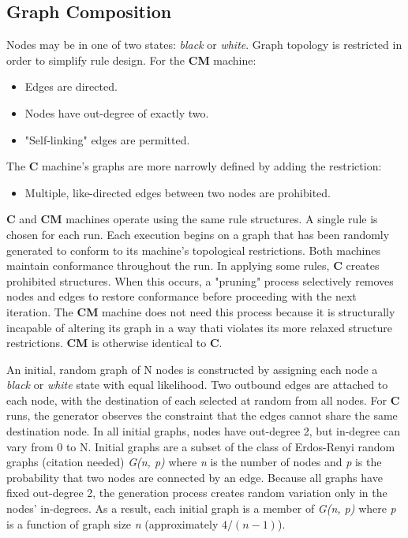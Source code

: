 \documentclass{tufte-handout}
\begin{document}
\subsection{Graph Composition}

Nodes may be in one of two states: \textit{black} or \textit{white}.
Graph topology is restricted in order to simplify rule design. For the
\textbf{CM} machine:

\vspace{1mm}
\begin{itemize}
\setlength{\itemindent}{2em}
    \item Edges are directed.
    \item Nodes have out-degree of exactly two.
    \item "Self-linking" edges are permitted.
\end{itemize}
\vspace{2mm}
The \textbf{C}  machine's graphs are more narrowly defined by adding the
restriction:
\begin{itemize} 
\setlength{\itemindent}{2em}
    \item Multiple, like-directed edges between two nodes are prohibited.
\end{itemize}
\vspace{2mm}

\textbf{C} and \textbf{CM} machines operate using the same rule structures.
A single rule is chosen for each run. Each execution
begins on a graph that has been randomly generated
to conform to its machine's topological restrictions. Both machines maintain conformance
throughout the run. In applying some rules, \textbf{C} creates prohibited
structures. When this occurs, a "pruning" process selectively
removes nodes and edges to restore conformance before proceeding with the
next iteration. The \textbf{CM} machine does not need this process because
it is structurally incapable of altering its graph in a way thati violates its more
relaxed structure restrictions. \textbf{CM} is otherwise identical to \textbf{C}.  

An initial, random graph of N nodes is constructed by assigning each node
a \textit{black} or \textit{white} state with equal likelihood.
Two outbound edges are attached to each node, with
the destination of each selected at random from all nodes. For \textbf{C} runs, the
generator observes the constraint that the edges cannot share the same destination node.
In all initial graphs, nodes have out-degree 2, but in-degree can vary from 0 to N.
Initial graphs are a subset of the class of Erdos-Renyi random graphs (citation needed)
\textit{G(n, p)} where \textit{n} is the number of nodes and \textit{p} is the probability
that two nodes are connected by an edge. Because all graphs have fixed out-degree 2,
the generation process creates random variation only in the nodes' in-degrees. As a result,
each initial graph is a member of \textit{G(n, p)} where \textit{p} is a function
of graph size \textit{n} (approximately \( 4 / (n - 1) \)).
\end{document}
